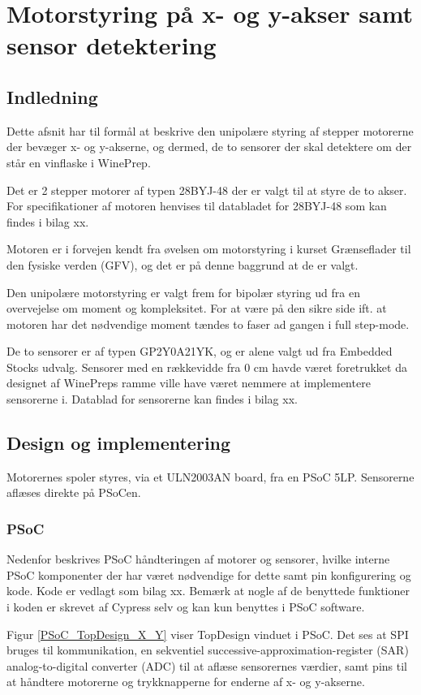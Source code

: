 \chapter{Motorstyring på x- og y-akser samt sensor detektering}
\section{Indledning}
Dette afsnit har til formål at beskrive den unipolære styring af stepper motorerne der bevæger x- og y-akserne, og dermed, de to sensorer der skal detektere om der står en vinflaske i WinePrep.

Det er 2 stepper motorer af typen 28BYJ-48 der er valgt til at styre de to akser. For specifikationer af motoren henvises til databladet for 28BYJ-48 som kan findes i bilag xx.

Motoren er i forvejen kendt fra øvelsen om motorstyring i kurset Grænseflader til den fysiske verden (GFV), og det er på denne baggrund at de er valgt.

Den unipolære motorstyring er valgt frem for bipolær styring ud fra en overvejelse om moment og kompleksitet. For at være på den sikre side ift. at motoren har det nødvendige moment tændes to faser ad gangen i full step-mode.

De to sensorer er af typen GP2Y0A21YK, og er alene valgt ud fra Embedded Stocks udvalg. Sensorer med en rækkevidde fra 0 cm havde været foretrukket da designet af WinePreps ramme ville have været nemmere at implementere sensorerne i. Datablad for sensorerne kan findes i bilag xx.

\section{Design og implementering}
Motorernes spoler styres, via et ULN2003AN board, fra en PSoC 5LP. Sensorerne aflæses direkte på PSoCen.

\subsection{PSoC}
Nedenfor beskrives PSoC håndteringen af motorer og sensorer, hvilke interne PSoC komponenter der har været nødvendige for dette samt pin konfigurering og kode. Kode er vedlagt som bilag xx. Bemærk at nogle af de benyttede funktioner i koden er skrevet af Cypress selv og kan kun benyttes i PSoC software.

Figur \ref{PSoC_TopDesign_X_Y} viser TopDesign vinduet i PSoC. Det ses at SPI bruges til kommunikation, en sekventiel successive-approximation-register (SAR) analog-to-digital converter (ADC) til at aflæse sensorernes værdier, samt pins til at håndtere motorerne og trykknapperne for enderne af x- og y-akserne.

